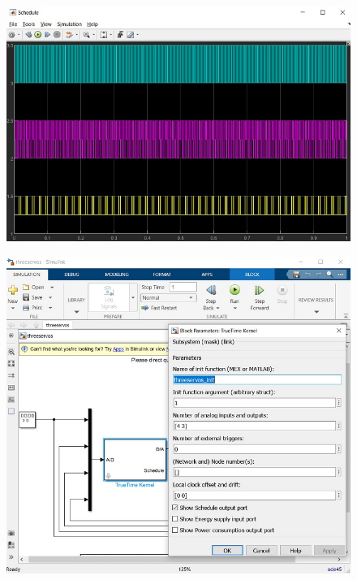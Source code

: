 \begin{figure}[H]
	\centering
	\includegraphics{6.jpg}
	\label{fig:label4}
\end{figure}

\begin{figure}[H]
	\centering
	\includegraphics{7.jpg}
	\label{fig:label4}
\end{figure}

